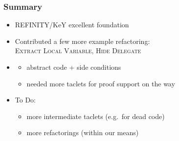 \documentclass[14pt,aspectratio=169]{beamer}
\newcommand\refa[1]{{\rmfamily\scshape {#1}}}
\begin{document}
\begin{frame}
  \frametitle{Summary}

  \begin{itemize}
  \item REFINITY/KeY excellent foundation
  \item Contributed a few more example refactoring:\\
    \refa{Extract Local Variable}, \refa{Hide Delegate}\\[-7ex]
  \item[] 
    \begin{itemize}
    \item abstract code + side conditions
    \item needed more taclets for proof support on the way
    \end{itemize}
  \item To Do:
    \begin{itemize}
    \item more intermediate taclets (e.g.\ for dead code)
    \item more refactorings (within our means)
    \end{itemize}
  \end{itemize}
\end{frame}
\end{document}
